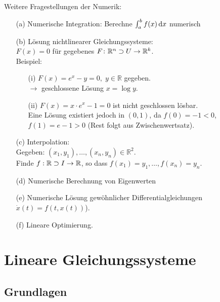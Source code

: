 Weitere Fragestellungen der Numerik:
\begin{enumerate}
\item[(a)]
Numerische Integration: Berechne $\int_a^b f(x) \,\mathrm d x$ numerisch
\item[(b)]
Lösung nichtlinearer Gleichungssysteme: \\
$F(x) = 0$ für gegebenes $F\colon \mathbb R^n \supset U \rightarrow \mathbb{R}^k$. \\
Beispiel:
\begin{enumerate}
\item[(i)]
$F(x)=e^x-y = 0,\; y \in \mathbb{R}$ gegeben. \\
$\rightarrow$ geschlossene Lösung $x = \log y.$
\item[(ii)]
$F(x)=x \cdot e^x -1 = 0$ ist nicht geschlossen lösbar. \\
Eine Lösung existiert jedoch in $(0,1)$, da $f(0) = -1 < 0$, \\
$f(1)= e-1>0 $ (Rest folgt aus Zwischenwertsatz).
\end{enumerate}
\item[(c)]
Interpolation: \\
Gegeben: $(x_1,y_1), \dots, (x_n,y_n) \in \mathbb{R}^2$. \\
Finde $f: \mathbb R \supset I \to \mathbb R$, so dass
$f(x_1) = y_1, \dots , f(x_n)=y_n$.
\item[(d)]
Numerische Berechnung von Eigenwerten
\item[(e)]
Numerische Lösung gewöhnlicher Differentialgleichungen $\dot x(t)=f(t,x(t))$).
\item[(f)]
Lineare Optimierung.
\end{enumerate}

\newpage
\section{Lineare Gleichungssysteme}

\subsection{Grundlagen}

